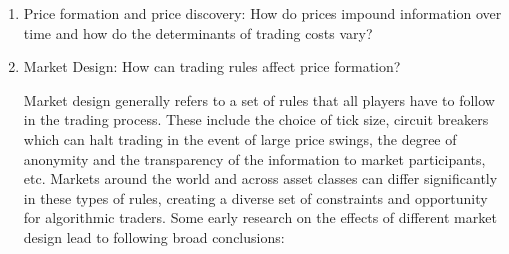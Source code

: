\begin{enumerate}[--]
\item Price formation and price discovery: How do prices impound information over time and how do the determinants of trading costs vary?

\item Market Design: How can trading rules affect price formation? 

Market design generally refers to a set of rules that all players have to follow in the trading process. These include the choice of tick size, circuit breakers\label{in:circ_br} which can halt trading in the event of large price swings, the degree of anonymity and the transparency of the information to market participants, etc. Markets around the world and across asset classes can differ significantly in these types of rules, creating a diverse set of constraints and opportunity for algorithmic traders. Some early research on the effects of different market design lead to following broad conclusions:



\end{enumerate}
